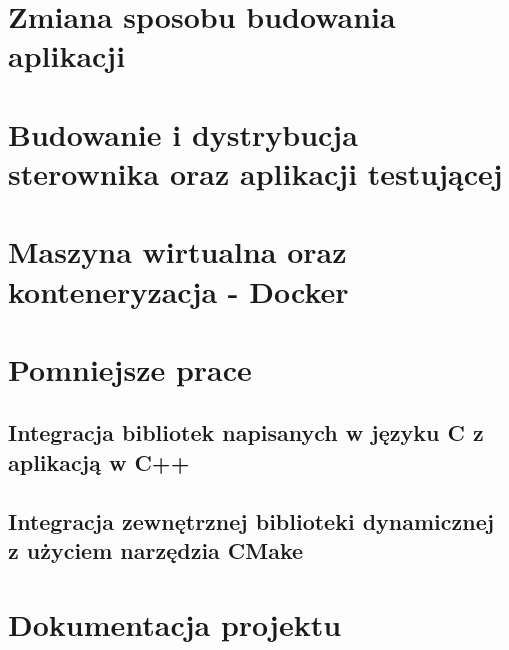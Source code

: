 
\section{Zmiana sposobu budowania aplikacji}

\section{Budowanie i dystrybucja sterownika oraz aplikacji testującej}

\section{Maszyna wirtualna oraz konteneryzacja - Docker}

\section{Pomniejsze prace}
\subsection{Integracja bibliotek napisanych w języku C z aplikacją w C++}
\subsection{Integracja zewnętrznej biblioteki dynamicznej z użyciem narzędzia CMake}

\section{Dokumentacja projektu}

